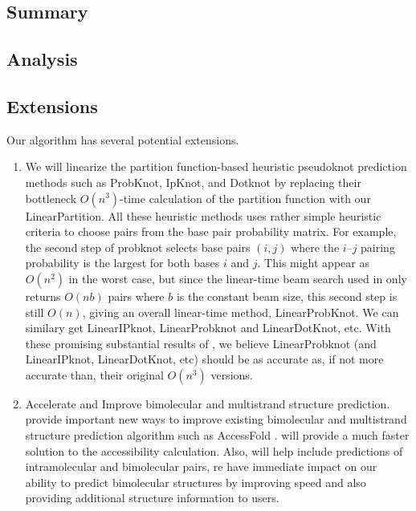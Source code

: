 
\subsection{Summary}



\subsection{Analysis}


\subsection{Extensions}

Our algorithm has several potential extensions.

\begin{enumerate}
\item 
We will linearize the partition function-based heuristic pseudoknot prediction methods such as ProbKnot, IpKnot, and Dotknot by replacing their bottleneck $O(n^3)$-time calculation of the partition function with our LinearPartition. 
All these heuristic methods uses rather simple heuristic criteria to choose pairs from the base pair probability matrix. 
For example, the second step of probknot selects base pairs $(i,j)$ where the $i–j$ pairing probability is the largest for both bases $i$ and $j$. 
This might appear as $O(n^2)$ in the worst case, 
but since the linear-time beam search used in \linearpartition only returns $O(nb)$ pairs where $b$ is the constant beam size, 
this second step is still $O(n)$, 
giving an overall linear-time method, LinearProbKnot. 
We can similary get LinearIPknot, LinearProbknot and LinearDotKnot, etc.
With these promising substantial results of \linearpartition, 
we believe LinearProbknot (and LinearIPknot, LinearDotKnot, etc) should be as accurate as, if not more accurate than, their original $O(n^3)$ versions.

\item Accelerate and Improve bimolecular and multistrand structure prediction.
\linearpartition provide important new ways to improve existing bimolecular and multistrand structure prediction algorithm such as AccessFold \cite{DiChiacchio+:2016}. 
\linearpartition will provide a much faster solution to the accessibility calculation.
Also, \linearpartition will help include predictions of intramolecular and bimolecular pairs, re
 have immediate impact on our ability to predict bimolecular structures by improving speed and also providing additional structure information to users.


\end{enumerate}






